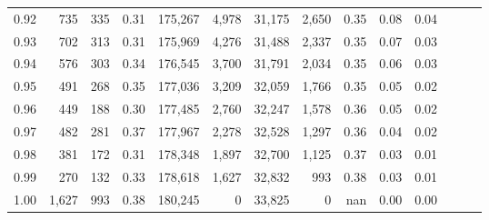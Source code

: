 \begin{tabular}{rrrrrrrrrrrrrr}
0.92 &    735 &  335 &  0.31 &  175,267 &    4,978 &  31,175 &   2,650 &  0.35 &  0.08 &      0.04 \\
0.93 &    702 &  313 &  0.31 &  175,969 &    4,276 &  31,488 &   2,337 &  0.35 &  0.07 &      0.03 \\
0.94 &    576 &  303 &  0.34 &  176,545 &    3,700 &  31,791 &   2,034 &  0.35 &  0.06 &      0.03 \\
0.95 &    491 &  268 &  0.35 &  177,036 &    3,209 &  32,059 &   1,766 &  0.35 &  0.05 &      0.02 \\
0.96 &    449 &  188 &  0.30 &  177,485 &    2,760 &  32,247 &   1,578 &  0.36 &  0.05 &      0.02 \\
0.97 &    482 &  281 &  0.37 &  177,967 &    2,278 &  32,528 &   1,297 &  0.36 &  0.04 &      0.02 \\
0.98 &    381 &  172 &  0.31 &  178,348 &    1,897 &  32,700 &   1,125 &  0.37 &  0.03 &      0.01 \\
0.99 &    270 &  132 &  0.33 &  178,618 &    1,627 &  32,832 &     993 &  0.38 &  0.03 &      0.01 \\
1.00 &  1,627 &  993 &  0.38 &  180,245 &        0 &  33,825 &       0 &   nan &  0.00 &      0.00 \\
\bottomrule
\end{tabular}
